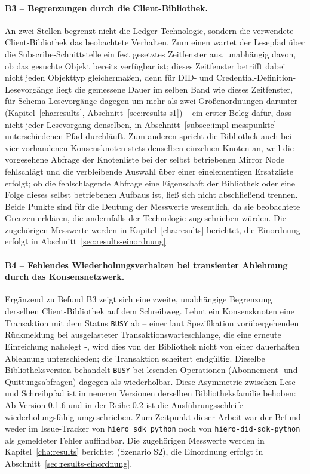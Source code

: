 \paragraph{B3 -- Begrenzungen durch die Client-Bibliothek.} An zwei Stellen begrenzt nicht die Ledger-Technologie, sondern die verwendete Client-Bibliothek das beobachtete Verhalten. Zum einen wartet der Lesepfad über die Subscribe-Schnittstelle ein fest gesetztes Zeitfenster aus, unabhängig davon, ob das gesuchte Objekt bereits verfügbar ist; dieses Zeitfenster betrifft dabei nicht jeden Objekttyp gleichermaßen, denn für DID- und Credential-Definition-Lesevorgänge liegt die gemessene Dauer im selben Band wie dieses Zeitfenster, für Schema-Lesevorgänge dagegen um mehr als zwei Größenordnungen darunter (Kapitel~\ref{cha:results}, Abschnitt~\ref{sec:results-s1}) -- ein erster Beleg dafür, dass nicht jeder Lesevorgang denselben, in Abschnitt~\ref{subsec:impl-messpunkte} unterschiedenen Pfad durchläuft. Zum anderen spricht die Bibliothek auch bei vier vorhandenen Konsensknoten stets denselben einzelnen Knoten an, weil die vorgesehene Abfrage der Knotenliste bei der selbst betriebenen Mirror Node fehlschlägt und die verbleibende Auswahl über einer einelementigen Ersatzliste erfolgt; ob die fehlschlagende Abfrage eine Eigenschaft der Bibliothek oder eine Folge dieses selbst betriebenen Aufbaus ist, ließ sich nicht abschließend trennen. Beide Punkte sind für die Deutung der Messwerte wesentlich, da sie beobachtete Grenzen erklären, die andernfalls der Technologie zugeschrieben würden. Die zugehörigen Messwerte werden in Kapitel~\ref{cha:results} berichtet, die Einordnung erfolgt in Abschnitt~\ref{sec:results-einordnung}.

\paragraph{B4 -- Fehlendes Wiederholungsverhalten bei transienter Ablehnung durch das Konsensnetzwerk.} Ergänzend zu Befund B3 zeigt sich eine zweite, unabhängige Begrenzung derselben Client-Bibliothek auf dem Schreibweg. Lehnt ein Konsensknoten eine Transaktion mit dem Status \texttt{BUSY} ab -- einer laut Spezifikation vorübergehenden Rückmeldung bei ausgelasteter Transaktionswarteschlange, die eine erneute Einreichung nahelegt -, wird dies von der Bibliothek nicht von einer dauerhaften Ablehnung unterschieden; die Transaktion scheitert endgültig. Dieselbe Bibliotheksversion behandelt \texttt{BUSY} bei lesenden Operationen (Abonnement- und Quittungsabfragen) dagegen als wiederholbar. Diese Asymmetrie zwischen Lese- und Schreibpfad ist in neueren Versionen derselben Bibliotheksfamilie behoben: Ab Version 0.1.6 und in der Reihe 0.2 ist die Ausführungsschleife wiederholungsfähig umgeschrieben. Zum Zeitpunkt dieser Arbeit war der Befund weder im Issue-Tracker von \texttt{hiero\_sdk\_python} noch von \texttt{hiero-did-sdk-python} als gemeldeter Fehler auffindbar. Die zugehörigen Messwerte werden in Kapitel~\ref{cha:results} berichtet (Szenario S2), die Einordnung erfolgt in Abschnitt~\ref{sec:results-einordnung}.


